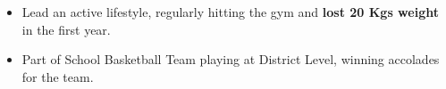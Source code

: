 {\fontsize{11pt}{1em}\bodyfontlight\upshape\color{text}
  \begin{itemize}
  \item Lead an active lifestyle, regularly hitting the gym and \textbf{lost 20 Kgs weight} in the first year. 
  \item Part of School Basketball Team playing at District Level, winning accolades for the team.
  \end{itemize}
}



